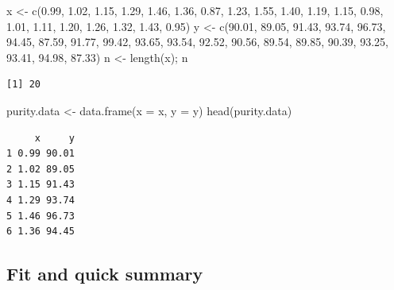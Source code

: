 \documentclass[
  letterpaper,
]{scrbook}
\newenvironment{Shaded}{\begin{snugshade}}{\end{snugshade}}
\newcommand{\AttributeTok}[1]{\textcolor[rgb]{0.40,0.45,0.13}{#1}}
\newcommand{\FloatTok}[1]{\textcolor[rgb]{0.68,0.00,0.00}{#1}}
\newcommand{\FunctionTok}[1]{\textcolor[rgb]{0.28,0.35,0.67}{#1}}
\newcommand{\NormalTok}[1]{\textcolor[rgb]{0.00,0.23,0.31}{#1}}
\newcommand{\OtherTok}[1]{\textcolor[rgb]{0.00,0.23,0.31}{#1}}
\begin{document}
\begin{Shaded}
\begin{Highlighting}[]
\NormalTok{x }\OtherTok{\textless{}{-}} \FunctionTok{c}\NormalTok{(}\FloatTok{0.99}\NormalTok{, }\FloatTok{1.02}\NormalTok{, }\FloatTok{1.15}\NormalTok{, }\FloatTok{1.29}\NormalTok{, }\FloatTok{1.46}\NormalTok{, }\FloatTok{1.36}\NormalTok{, }\FloatTok{0.87}\NormalTok{, }\FloatTok{1.23}\NormalTok{, }\FloatTok{1.55}\NormalTok{, }\FloatTok{1.40}\NormalTok{, }\FloatTok{1.19}\NormalTok{,}
       \FloatTok{1.15}\NormalTok{, }\FloatTok{0.98}\NormalTok{, }\FloatTok{1.01}\NormalTok{, }\FloatTok{1.11}\NormalTok{, }\FloatTok{1.20}\NormalTok{, }\FloatTok{1.26}\NormalTok{, }\FloatTok{1.32}\NormalTok{, }\FloatTok{1.43}\NormalTok{, }\FloatTok{0.95}\NormalTok{)}
\NormalTok{y }\OtherTok{\textless{}{-}} \FunctionTok{c}\NormalTok{(}\FloatTok{90.01}\NormalTok{, }\FloatTok{89.05}\NormalTok{, }\FloatTok{91.43}\NormalTok{, }\FloatTok{93.74}\NormalTok{, }\FloatTok{96.73}\NormalTok{, }\FloatTok{94.45}\NormalTok{, }\FloatTok{87.59}\NormalTok{, }\FloatTok{91.77}\NormalTok{, }\FloatTok{99.42}\NormalTok{, }\FloatTok{93.65}\NormalTok{,}
       \FloatTok{93.54}\NormalTok{, }\FloatTok{92.52}\NormalTok{, }\FloatTok{90.56}\NormalTok{, }\FloatTok{89.54}\NormalTok{, }\FloatTok{89.85}\NormalTok{, }\FloatTok{90.39}\NormalTok{, }\FloatTok{93.25}\NormalTok{, }\FloatTok{93.41}\NormalTok{, }\FloatTok{94.98}\NormalTok{, }\FloatTok{87.33}\NormalTok{)}
\NormalTok{n }\OtherTok{\textless{}{-}} \FunctionTok{length}\NormalTok{(x); n}
\end{Highlighting}
\end{Shaded}

\begin{verbatim}
[1] 20
\end{verbatim}

\begin{Shaded}
\begin{Highlighting}[]
\NormalTok{purity.data }\OtherTok{\textless{}{-}} \FunctionTok{data.frame}\NormalTok{(}\AttributeTok{x =}\NormalTok{ x, }\AttributeTok{y =}\NormalTok{ y)}
\FunctionTok{head}\NormalTok{(purity.data)}
\end{Highlighting}
\end{Shaded}

\begin{verbatim}
     x     y
1 0.99 90.01
2 1.02 89.05
3 1.15 91.43
4 1.29 93.74
5 1.46 96.73
6 1.36 94.45
\end{verbatim}

\subsection{Fit and quick summary}\label{fit-and-quick-summary}
\end{document}
